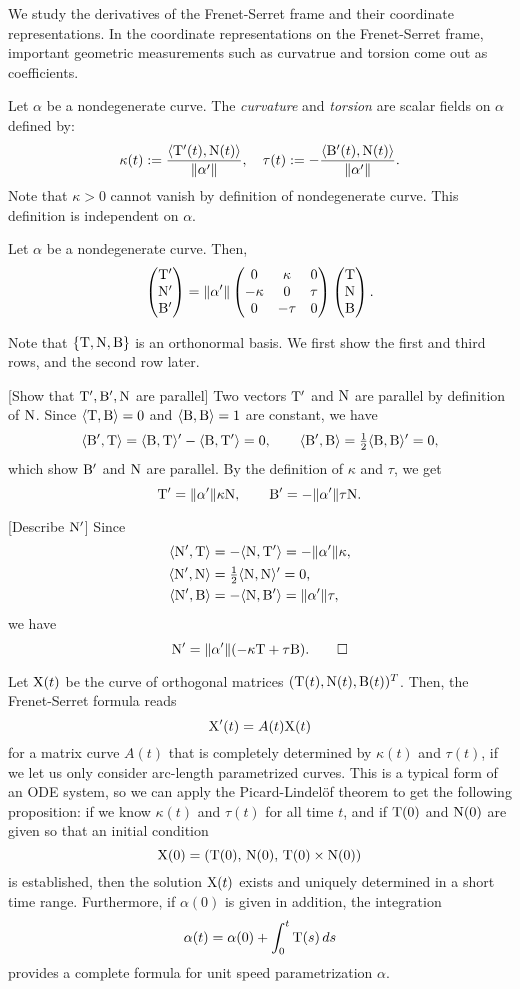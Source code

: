 \documentclass{../exp}
\def\a{\alpha}
\begin{document}
We study the derivatives of the Frenet-Serret frame and their coordinate representations.
In the coordinate representations on the Frenet-Serret frame, important geometric measurements such as curvatrue and torsion come out as coefficients.

\begin{defn}
Let $\a$ be a nondegenerate curve.
The \emph{curvature} and \emph{torsion} are scalar fields on $\a$ defined by:
\[\kappa(t):=\frac{\<\rT'(t),\rN(t)\>}{\|\a'\|},\quad\tau(t):=-\frac{\<\rB'(t),\rN(t)\>}{\|\a'\|}.\]
Note that $\kappa>0$ cannot vanish by definition of nondegenerate curve.
This definition is independent on $\a$.
\end{defn}

\begin{thm}
Let $\a$ be a nondegenerate curve.
Then,
\[\mat{\rT'\\\rN'\\\rB'}=\|\a'\|\mat{0&\kappa&0\\-\kappa&0&\tau\\0&-\tau&0}\mat{\rT\\\rN\\\rB}.\]
\end{thm}
\begin{pf}
Note that $\{\mathrm{T},\mathrm{N},\mathrm{B}\}$ is an orthonormal basis.
We first show the first and third rows, and the second row later.

[Show that $\mathrm{T}',\mathrm{B}',\mathrm{N}$ are parallel]
Two vectors $\mathrm{T}'$ and $\mathrm{N}$ are parallel by definition of $\mathrm{N}$.
Since $\langle\mathrm{T},\mathrm{B}\rangle=0$ and $\langle\mathrm{B},\mathrm{B}\rangle=1$ are constant, we have
\[\langle\mathrm{B}',\mathrm{T}\rangle=\langle\mathrm{B},\mathrm{T}\rangle'-\langle\mathrm{B},\mathrm{T}'\rangle=0,\qquad\langle\mathrm{B}',\mathrm{B}\rangle=\tfrac12\langle\mathrm{B},\mathrm{B}\rangle'=0,\]
which show $\mathrm{B}'$ and $\mathrm{N}$ are parallel.
By the definition of $\kappa$ and $\tau$, we get
\[\rT'=\|\a'\|\kappa\rN,\qquad\rB'=-\|\a'\|\tau\rN.\]

[Describe $\mathrm{N}'$]
Since
\begin{align*}
\<\rN',\rT\>&=-\<\rN,\rT'\>=-\|\a'\|\kappa,\\
\<\rN',\rN\>&=\tfrac12\<\rN,\rN\>'=0,\\
\<\rN',\rB\>&=-\<\rN,\rB'\>=\|\a'\|\tau,
\end{align*}
we have
\[\rN'=\|\a'\|(-\kappa\rT+\tau\rB).\qedhere\]
\end{pf}
\begin{rmk}
Let $\mathrm{X}(t)$ be the curve of orthogonal matrices $(\mathrm{T}(t),\mathrm{N}(t),\mathrm{B}(t))^T$.
Then, the Frenet-Serret formula reads
\[\mathrm{X}'(t)=A(t)\mathrm{X}(t)\]
for a matrix curve $A(t)$ that is completely determined by $\kappa(t)$ and $\tau(t)$, if we let us only consider arc-length parametrized curves.
This is a typical form of an ODE system, so we can apply the Picard-Lindel\"of theorem to get the following proposition: if we know $\kappa(t)$ and $\tau(t)$ for all time $t$, and if $\mathrm{T}(0)$ and $\mathrm{N}(0)$ are given so that an initial condition
\[\mathrm{X}(0)=(\mathrm{T}(0),\,\mathrm{N}(0),\,\mathrm{T}(0)\times\mathrm{N}(0))\]
is established, then the solution $\mathrm{X}(t)$ exists and uniquely determined in a short time range.
Furthermore, if $\a(0)$ is given in addition, the integration
\[\a(t)=\a(0)+\int_0^t\rT(s)\,ds\]
provides a complete formula for unit speed parametrization $\a$.
\end{rmk}
\end{document}
